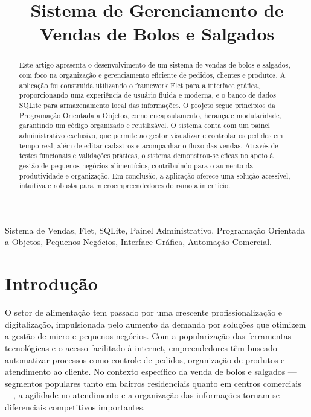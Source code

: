 \documentclass[conference]{IEEEtran}
\begin{document}
\title{Sistema de Gerenciamento de Vendas de Bolos e Salgados}

\author{
}

\maketitle

\begin{abstract}
Este artigo apresenta o desenvolvimento de um sistema de vendas de bolos e salgados, com foco na organização e gerenciamento eficiente de pedidos, clientes e produtos. A aplicação foi construída utilizando o framework Flet para a interface gráfica, proporcionando uma experiência de usuário fluida e moderna, e o banco de dados SQLite para armazenamento local das informações. O projeto segue princípios da Programação Orientada a Objetos, como encapsulamento, herança e modularidade, garantindo um código organizado e reutilizável. O sistema conta com um painel administrativo exclusivo, que permite ao gestor visualizar e controlar os pedidos em tempo real, além de editar cadastros e acompanhar o fluxo das vendas. Através de testes funcionais e validações práticas, o sistema demonstrou-se eficaz no apoio à gestão de pequenos negócios alimentícios, contribuindo para o aumento da produtividade e organização. Em conclusão, a aplicação oferece uma solução acessível, intuitiva e robusta para microempreendedores do ramo alimentício.
\end{abstract}

\begin{IEEEkeywords}
Sistema de Vendas, Flet, SQLite, Painel Administrativo, Programação Orientada a Objetos, Pequenos Negócios, Interface Gráfica, Automação Comercial.
\end{IEEEkeywords}

\section{Introdução}
O setor de alimentação tem passado por uma crescente profissionalização e digitalização, impulsionada pelo aumento da demanda por soluções que otimizem a gestão de micro e pequenos negócios. Com a popularização das ferramentas tecnológicas e o acesso facilitado à internet, empreendedores têm buscado automatizar processos como controle de pedidos, organização de produtos e atendimento ao cliente. No contexto específico da venda de bolos e salgados — segmentos populares tanto em bairros residenciais quanto em centros comerciais —, a agilidade no atendimento e a organização das informações tornam-se diferenciais competitivos importantes.
\end{document}
